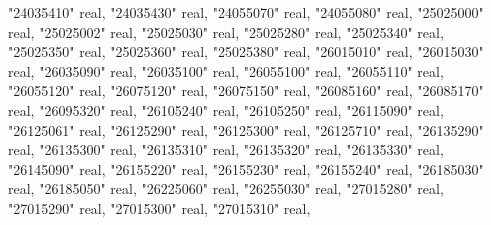 \documentclass[12pt,twoside]{reedthesis}
\newenvironment{Shaded}{\begin{snugshade}}{\end{snugshade}}
\newcommand{\DataTypeTok}[1]{\textcolor[rgb]{0.13,0.29,0.53}{#1}}
\newcommand{\NormalTok}[1]{#1}
\newcommand{\OtherTok}[1]{\textcolor[rgb]{0.56,0.35,0.01}{#1}}
\begin{document}
\begin{Shaded}
\begin{Highlighting}[]
     \OtherTok{"24035410"} \DataTypeTok{real}\NormalTok{, }\OtherTok{"24035430"} \DataTypeTok{real}\NormalTok{, }\OtherTok{"24055070"} \DataTypeTok{real}\NormalTok{, }\OtherTok{"24055080"} \DataTypeTok{real}\NormalTok{, }\OtherTok{"25025000"} \DataTypeTok{real}\NormalTok{, }\OtherTok{"25025002"} \DataTypeTok{real}\NormalTok{, }
     \OtherTok{"25025030"} \DataTypeTok{real}\NormalTok{, }\OtherTok{"25025280"} \DataTypeTok{real}\NormalTok{, }\OtherTok{"25025340"} \DataTypeTok{real}\NormalTok{, }\OtherTok{"25025350"} \DataTypeTok{real}\NormalTok{, }\OtherTok{"25025360"} \DataTypeTok{real}\NormalTok{, }\OtherTok{"25025380"} \DataTypeTok{real}\NormalTok{, }
     \OtherTok{"26015010"} \DataTypeTok{real}\NormalTok{, }\OtherTok{"26015030"} \DataTypeTok{real}\NormalTok{, }\OtherTok{"26035090"} \DataTypeTok{real}\NormalTok{, }\OtherTok{"26035100"} \DataTypeTok{real}\NormalTok{, }\OtherTok{"26055100"} \DataTypeTok{real}\NormalTok{, }\OtherTok{"26055110"} \DataTypeTok{real}\NormalTok{, }
     \OtherTok{"26055120"} \DataTypeTok{real}\NormalTok{, }\OtherTok{"26075120"} \DataTypeTok{real}\NormalTok{, }\OtherTok{"26075150"} \DataTypeTok{real}\NormalTok{, }\OtherTok{"26085160"} \DataTypeTok{real}\NormalTok{, }\OtherTok{"26085170"} \DataTypeTok{real}\NormalTok{, }\OtherTok{"26095320"} \DataTypeTok{real}\NormalTok{, }
     \OtherTok{"26105240"} \DataTypeTok{real}\NormalTok{, }\OtherTok{"26105250"} \DataTypeTok{real}\NormalTok{, }\OtherTok{"26115090"} \DataTypeTok{real}\NormalTok{, }\OtherTok{"26125061"} \DataTypeTok{real}\NormalTok{, }\OtherTok{"26125290"} \DataTypeTok{real}\NormalTok{, }\OtherTok{"26125300"} \DataTypeTok{real}\NormalTok{, }
     \OtherTok{"26125710"} \DataTypeTok{real}\NormalTok{, }\OtherTok{"26135290"} \DataTypeTok{real}\NormalTok{, }\OtherTok{"26135300"} \DataTypeTok{real}\NormalTok{, }\OtherTok{"26135310"} \DataTypeTok{real}\NormalTok{, }\OtherTok{"26135320"} \DataTypeTok{real}\NormalTok{, }\OtherTok{"26135330"} \DataTypeTok{real}\NormalTok{, }
     \OtherTok{"26145090"} \DataTypeTok{real}\NormalTok{, }\OtherTok{"26155220"} \DataTypeTok{real}\NormalTok{, }\OtherTok{"26155230"} \DataTypeTok{real}\NormalTok{, }\OtherTok{"26155240"} \DataTypeTok{real}\NormalTok{, }\OtherTok{"26185030"} \DataTypeTok{real}\NormalTok{, }\OtherTok{"26185050"} \DataTypeTok{real}\NormalTok{, }
     \OtherTok{"26225060"} \DataTypeTok{real}\NormalTok{, }\OtherTok{"26255030"} \DataTypeTok{real}\NormalTok{, }\OtherTok{"27015280"} \DataTypeTok{real}\NormalTok{, }\OtherTok{"27015290"} \DataTypeTok{real}\NormalTok{, }\OtherTok{"27015300"} \DataTypeTok{real}\NormalTok{, }\OtherTok{"27015310"} \DataTypeTok{real}\NormalTok{, }

\end{Highlighting}
\end{Shaded}
\end{document}
